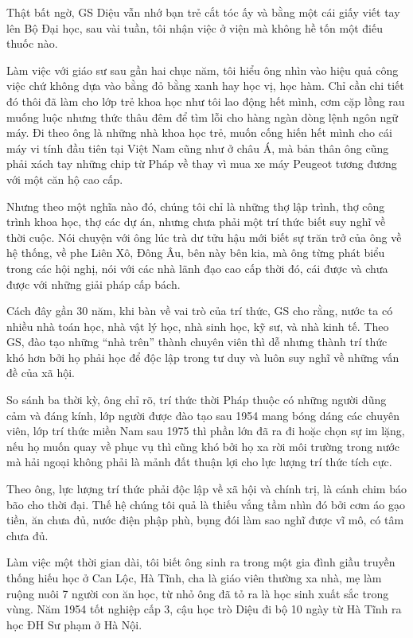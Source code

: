 Thật bất ngờ, GS Diệu vẫn nhớ bạn trẻ cắt tóc ấy và bằng một cái giấy viết tay lên Bộ Đại học, sau vài tuần, tôi nhận việc ở viện mà không hề tốn một điếu thuốc nào.

Làm việc với giáo sư sau gần hai chục năm, tôi hiểu ông nhìn vào hiệu quả công việc chứ không dựa vào bằng đỏ bằng xanh hay học vị, học hàm. Chỉ cần chi tiết đó thôi đã làm cho lớp trẻ khoa học như tôi lao động hết mình, cơm cặp lồng rau muống luộc nhưng thức thâu đêm để tìm lỗi cho hàng ngàn dòng lệnh ngôn ngữ máy. 
Đi theo ông là những nhà khoa học trẻ, muốn cống hiến hết mình cho cái máy vi tính đầu tiên tại Việt Nam cũng như ở châu Á, mà bản thân ông cũng phải xách tay những chip từ Pháp về thay vì mua xe máy Peugeot tương đương với một căn hộ cao cấp.

Nhưng theo một nghĩa nào đó, chúng tôi chỉ là những thợ lập trình, thợ công trình khoa học, thợ các dự án, nhưng chưa phải một trí thức biết suy nghĩ về thời cuộc. Nói chuyện với ông lúc trà dư tửu hậu mới biết sự trăn trở của ông về hệ thống, về phe Liên Xô, Đông Âu, bên này bên kia, mà ông từng phát biểu trong các hội nghị, nói với các nhà lãnh đạo cao cấp thời đó, cái được và chưa được với những giải pháp cấp bách.

Cách đây gần 30 năm, khi bàn về vai trò của trí thức, GS cho rằng, nước ta có nhiều nhà toán học, nhà vật lý học, nhà sinh học, kỹ sư, và nhà kinh tế. Theo GS, đào tạo những “nhà trên” thành chuyên viên thì dễ nhưng thành trí thức khó hơn bởi họ phải học để độc lập trong tư duy và luôn suy nghĩ về những vấn đề của xã hội.

So sánh ba thời kỳ, ông chỉ rõ, trí thức thời Pháp thuộc có những người dũng cảm và đáng kính, lớp người được đào tạo sau 1954 mang bóng dáng các chuyên viên, lớp trí thức miền Nam sau 1975 thì phần lớn đã ra đi hoặc chọn sự im lặng, nếu họ muốn quay về phục vụ thì cũng khó bởi họ xa rời môi trường trong nước mà hải ngoại không phải là mảnh đất thuận lợi cho lực lượng trí thức tích cực.

Theo ông, lực lượng trí thức phải độc lập về xã hội và chính trị, là cánh chim báo bão cho thời đại. Thế hệ chúng tôi quả là thiếu vắng tầm nhìn đó bởi cơm áo gạo tiền, ăn chưa đủ, nước điện phập phù, bụng đói làm sao nghĩ được vĩ mô, có tâm chưa đủ.

Làm việc một thời gian dài, tôi biết ông sinh ra trong một gia đình giầu truyền thống hiếu học ở Can Lộc, Hà Tĩnh, cha là giáo viên thường xa nhà, mẹ làm ruộng nuôi 7 người con ăn học, từ nhỏ ông đã tỏ ra là học sinh xuất sắc trong vùng. Năm 1954 tốt nghiệp cấp 3, cậu học trò Diệu đi bộ 10 ngày từ Hà Tĩnh ra học ĐH Sư phạm ở Hà Nội.


